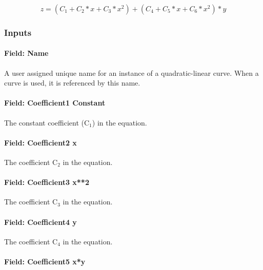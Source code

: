 \begin{equation}
z = \left( {{C_1} + {C_2}*x + {C_3}*{x^2}} \right) + \left( {{C_4} + {C_5}*x + {C_6}*{x^2}} \right)*y
\end{equation}

\subsubsection{Inputs}\label{inputs-9-012}

\paragraph{Field: Name}\label{field-name-10-010}

A user assigned unique name for an instance of a quadratic-linear curve. When a curve is used, it is referenced by this name.

\paragraph{Field: Coefficient1 Constant}\label{field-coefficient1-constant-9}

The constant coefficient (C\(_{1}\)) in the equation.

\paragraph{Field: Coefficient2 x}\label{field-coefficient2-x-7}

The coefficient C\(_{2}\) in the equation.

\paragraph{Field: Coefficient3 x**2}\label{field-coefficient3-x2-5}

The coefficient C\(_{3}\) in the equation.

\paragraph{Field: Coefficient4 y}\label{field-coefficient4-y-3}

The coefficient C\(_{4}\) in the equation.

\paragraph{Field: Coefficient5 x*y}\label{field-coefficient5-xy}

